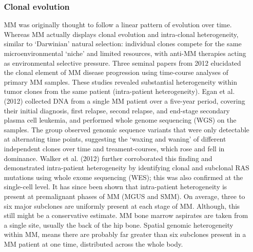 \subsubsection{Clonal evolution}
MM was originally thought to follow a linear pattern of evolution over time.
Whereas MM actually displays clonal evolution and intra-clonal heterogeneity, similar to `Darwinian' natural selection: individual clones compete for the same microenvironmental `niche' and limited resources, with anti-MM therapies acting as environmental selective pressure.
Three seminal papers from 2012 elucidated the clonal element of MM disease progression using time-course analyses of primary MM samples\cite{egan2012whole, keats2012clonal, walker2012intraclonal}.
These studies revealed substantial heterogeneity within tumor clones from the same patient (intra-patient heterogeneity).
Egan et al. (2012) collected DNA from a single MM patient over a five-year period, covering their initial diagnosis, first relapse, second relapse, and end-stage secondary plasma cell leukemia, and performed whole genome sequencing (WGS) on the samples\cite{egan2012whole}.
The group observed genomic sequence variants that were only detectable at alternating time points, suggesting the `waxing and waning' of different independent clones over time and treament-courses, which rose and fell in dominance\cite{egan2012whole}.
Walker et al. (2012) further corroborated this finding and demonstrated intra-patient heterogeneity by identifying clonal and subclonal RAS mutations using whole exome sequencing (WES); this was also confirmed at the single-cell level\cite{walker2012intraclonal}\@.
It has since been shown that intra-patient heterogeneity is present at premalignant phases of MM (MGUS and SMM)\@.
On average, three to six major subclones are uniformly present at each stage of MM\cite{furukawa2020molecular}.
Although, this still might be a conservative estimate.
MM bone marrow aspirates are taken from a single site, usually the back of the hip bone.
Spatial genomic heterogeneity within MM, means there are probably far greater than six subclones present in a MM patient at one time, distributed across the whole body\cite{rasche2017spatial}.

